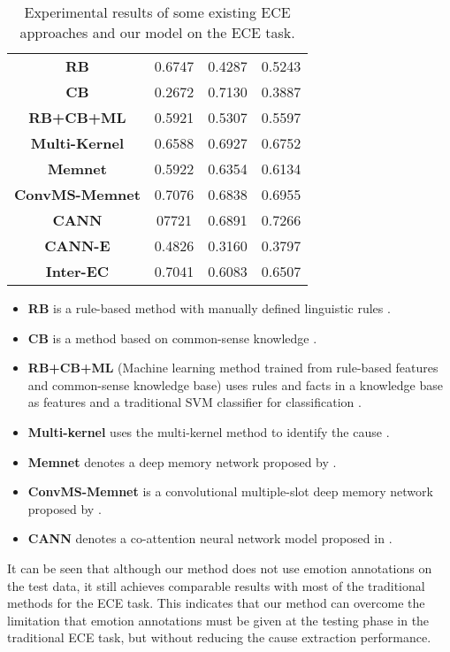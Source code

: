 \documentclass[11pt,a4paper]{article}
\begin{document}
\begin{table}
	\small
	\centering
	\begin{tabular} {c|c|c|c}
		\hline
		 &  &  & \\
		\hline
		\textbf{RB} & 0.6747 & 0.4287 & 0.5243\\
		\textbf{CB} & 0.2672 & 0.7130 & 0.3887\\
		\textbf{RB+CB+ML} & 0.5921 & 0.5307 & 0.5597\\
		\textbf{Multi-Kernel} & 0.6588 & 0.6927 & 0.6752\\
		\textbf{Memnet} & 0.5922 & 0.6354 & 0.6134\\
		\textbf{ConvMS-Memnet} & 0.7076 & 0.6838 & 0.6955\\
		\textbf{CANN} & 07721 & 0.6891 & 0.7266\\
		\hline
		\textbf{CANN-E} & 0.4826 & 0.3160 & 0.3797\\
		\textbf{Inter-EC} & 0.7041 & 0.6083 & 0.6507\\
		\hline
	\end{tabular}
	\caption{Experimental results of some existing ECE approaches and our model on the ECE task.}
	\label{TableFive}
\end{table}
\begin{itemize}
	\item \textbf{RB} is a rule-based method with manually defined linguistic rules \cite{lee2010text}.
	\item \textbf{CB} is a method based on common-sense knowledge \cite{russo2011emocause}.
	\item \textbf{RB+CB+ML} (Machine learning method trained from rule-based features and common-sense knowledge base) uses rules and facts in a knowledge base as features and a traditional SVM classifier for classification \cite{chen2010emotion}.
	\item \textbf{Multi-kernel} uses the multi-kernel method to identify the cause \cite{gui2016event}.
	\item \textbf{Memnet} denotes a deep memory network proposed by \citet{gui2017question}.
	\item \textbf{ConvMS-Memnet} is a convolutional multiple-slot deep memory network proposed by \citet{gui2017question}.
	\item \textbf{CANN} denotes a co-attention neural network model proposed in \citet{li2018co}.
\end{itemize}

It can be seen that although our method does not use emotion annotations on the test data, it still achieves comparable results with most of the traditional methods for the ECE task. This indicates that our method can overcome the limitation that emotion annotations must be given at the testing phase in the traditional ECE task, but without reducing the cause extraction performance.
\end{document}
